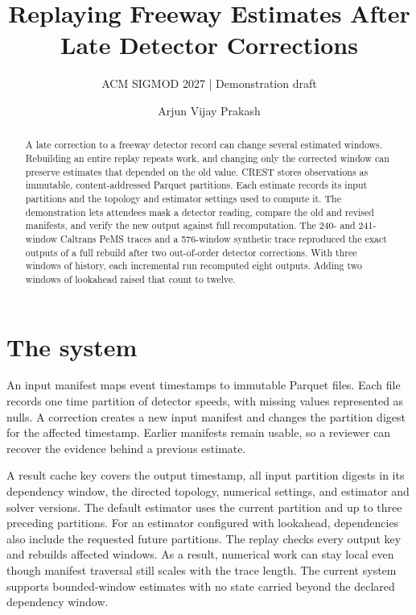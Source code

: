 \documentclass[sigconf,nonacm]{acmart}
\title{Replaying Freeway Estimates After Late Detector Corrections}
\subtitle{ACM SIGMOD 2027 | Demonstration draft}
\author{Arjun Vijay Prakash}
\affiliation{\institution{Independent Researcher}\city{ }\country{ }}
\begin{document}
\begin{abstract}
A late correction to a freeway detector record can change several estimated windows. Rebuilding
an entire replay repeats work, and changing only the corrected window can preserve estimates
that depended on the old value. CREST stores observations as immutable, content-addressed
Parquet partitions. Each estimate records its input partitions and the topology and estimator
settings used to compute it. The demonstration lets attendees mask a detector reading, compare
the old and revised manifests, and verify the new output against full recomputation. The
240- and 241-window Caltrans PeMS traces and a 576-window synthetic trace reproduced the exact outputs of
a full rebuild after two out-of-order detector corrections. With three windows of history, each
incremental run recomputed eight outputs. Adding two windows of lookahead raised that count to
twelve.
\end{abstract}

\maketitle

\section*{The system}
An input manifest maps event timestamps to immutable Parquet files. Each file records one time
partition of detector speeds, with missing values represented as nulls. A correction creates a
new input manifest and changes the partition digest for the affected timestamp. Earlier
manifests remain usable, so a reviewer can recover the evidence behind a previous estimate.

A result cache key covers the output timestamp, all input partition digests in its dependency
window, the directed topology, numerical settings, and estimator and solver versions. The
default estimator uses the current partition and up to three preceding partitions. For an
estimator configured with lookahead, dependencies also include the requested future partitions.
The replay checks every output key and rebuilds affected windows. As a result, numerical work
can stay local even though manifest traversal still scales with the trace length. The current
system supports bounded-window estimates with no state carried beyond the declared dependency
window.
\end{document}

